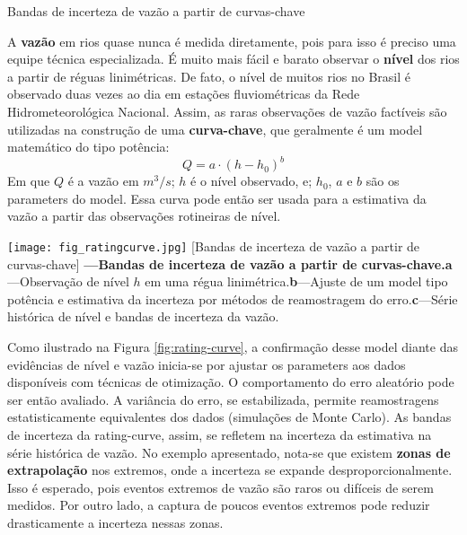 \documentclass[./main.tex]{subfiles}
\begin{document}
\begin{simplebox}[
    float=htb,
    label={destaque_curvas_chave},
    nameref={Curvas-chave}
    ]{Bandas de incerteza de vazão a partir de curvas-chave}
    \footnotesize
    \begin{minipage}[t]{\linewidth}    
    \par A \textbf{vazão} em rios quase nunca é medida diretamente, pois para isso é preciso uma equipe técnica especializada. É muito mais fácil e barato observar o \textbf{nível} dos rios a partir de réguas linimétricas. De fato, o nível de muitos rios no Brasil é observado duas vezes ao dia em estações fluviométricas da Rede Hidrometeorológica Nacional. Assim, as raras observações de vazão factíveis são utilizadas na construção de uma \textbf{curva-chave}, que geralmente é um \gls{model} matemático do tipo potência:
    \begin{equation*} %
    		\label{eq:rating_curve}
    		Q = a \cdot (h - h_0)^b
    \end{equation*}
    Em que $Q$ é a vazão em $m^{3}/s$; $h$ é o nível observado, e; $h_0$, $a$ e $b$ são os \gls{parameters} do \gls{model}. Essa curva pode então ser usada para a estimativa da vazão a partir das observações rotineiras de nível. 
    \end{minipage}
    \begin{minipage}[t]{\linewidth}
        \begin{minipage}[t]{\linewidth}
        \vspace*{5pt}
        	\texttt{[image: fig\_ratingcurve.jpg]}		
        	[Bandas de incerteza de vazão a partir de curvas-chave]{
                \textbf{---\;Bandas de incerteza de vazão a partir de curvas-chave.}\;\textbf{a}\;---\;Observação de nível $h$ em uma régua linimétrica.\;\textbf{b}\;---\;Ajuste de um \gls{model} tipo potência e estimativa da incerteza por métodos de reamostragem do erro.\;\textbf{c}\;---\;Série histórica de nível e bandas de incerteza da vazão.
        	}
            \label{fig:rating-curve}  %
        \vspace*{5pt}
    \end{minipage}
    \end{minipage}
    \begin{minipage}[t]{\linewidth}
    \par Como ilustrado na Figura \ref{fig:rating-curve}, a confirmação desse \gls{model} diante das evidências de nível e vazão inicia-se por ajustar os \gls{parameters} aos dados disponíveis com técnicas de otimização. O comportamento do erro aleatório pode ser então avaliado. A variância do erro, se estabilizada, permite reamostragens estatisticamente equivalentes dos dados (simulações de Monte Carlo). As bandas de incerteza da \gls{rating-curve}, assim, se refletem na incerteza da estimativa na série histórica de vazão. No exemplo apresentado, nota-se que existem \textbf{zonas de extrapolação} nos extremos, onde a incerteza se expande desproporcionalmente. Isso é esperado, pois eventos extremos de vazão são raros ou difíceis de serem medidos. Por outro lado, a captura de poucos eventos extremos pode reduzir drasticamente a incerteza nessas zonas. 

\end{minipage}
\end{simplebox}
\end{document}

